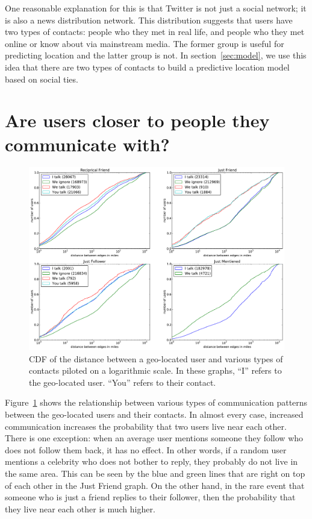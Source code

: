 One reasonable explanation for this is that Twitter is not just a social
network; it is also a news distribution network.  This distribution
suggests that users have two types of contacts: people who they met in
real life, and people who they met online or know about via mainstream media.
The former group is useful for predicting location and the latter group is not.
In section~\ref{sec:model}, we use this idea that there are two types of
contacts to build a predictive location model based on social ties.


\section{Are users closer to people they communicate with?}

\begin{figure}[tb]
\centering
\includegraphics[width=\linewidth]{figures/com_types.pdf}
\caption{
CDF of the distance between a geo-located user and various types of contacts
piloted on a logarithmic scale.
In these graphs, ``I'' refers to the geo-located user. ``You'' refers to their
contact.
}
\label{fig:ComTypes}
\end{figure}

Figure~\ref{fig:ComTypes} shows the relationship between various types of
communication patterns between the geo-located users and their contacts.
In almost every case, increased communication increases the probability that
two users live near each other.
There is one exception: when an average user mentions someone they follow who
does not follow them back, it has no effect.
In other words, if a random user mentions a celebrity who does not bother to
reply, they probably do not live in the same area. This can be seen by the blue
and green lines that are right on top of each other in the Just Friend graph.
On the other hand, in the rare event that someone who is just a friend replies
to their follower, then the probability that they live near each other is much
higher.

